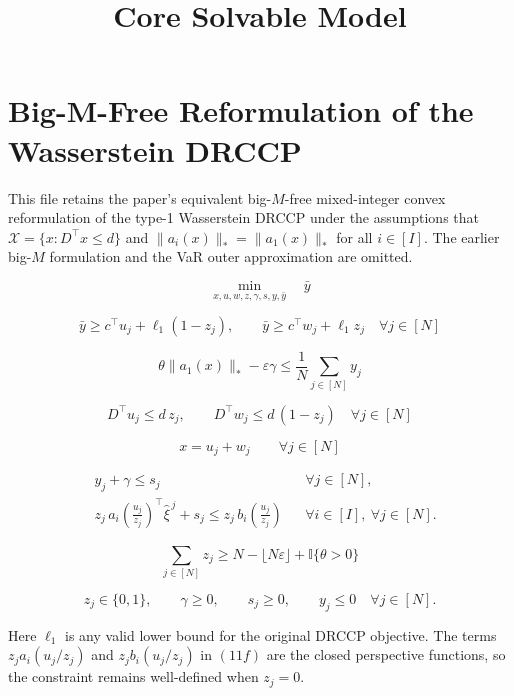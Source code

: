 \documentclass[11pt,a4paper]{article}
\title{Core Solvable Model}
\author{}
\date{}
\begin{document}
\maketitle

\section*{Big-M-Free Reformulation of the Wasserstein DRCCP}
This file retains the paper's equivalent big-\(M\)-free mixed-integer convex reformulation of the type-1 Wasserstein DRCCP under the assumptions that \(\mathcal{X}=\{x: D^\top x \le d\}\) and \(\|a_i(x)\|_* = \|a_1(x)\|_*\) for all \(i\in[I]\). The earlier big-\(M\) formulation and the VaR outer approximation are omitted.

\begin{equation}
\min_{x,u,w,z,\gamma,s,y,\bar y}\quad \bar y
\tag{11a}
\end{equation}

\begin{equation}
\bar y \ge c^\top u_j + \ell_1(1-z_j),
\qquad
\bar y \ge c^\top w_j + \ell_1 z_j
\quad \forall j\in[N]
\tag{11b}
\end{equation}

\begin{equation}
\theta \|a_1(x)\|_* - \varepsilon \gamma
\le
\frac{1}{N}\sum_{j\in[N]} y_j
\tag{11c}
\end{equation}

\begin{equation}
D^\top u_j \le d\,z_j,\qquad
D^\top w_j \le d\,(1-z_j)
\quad \forall j\in[N]
\tag{11d}
\end{equation}

\begin{equation}
x = u_j + w_j
\qquad \forall j\in[N]
\tag{11e}
\end{equation}

\begin{equation}
\begin{aligned}
& y_j + \gamma \le s_j
&& \forall j\in[N], \\
& z_j\, a_i\!\left(\frac{u_j}{z_j}\right)^\top \hat\xi^{\,j} + s_j
\le
z_j\, b_i\!\left(\frac{u_j}{z_j}\right)
&& \forall i\in[I],\ \forall j\in[N].
\end{aligned}
\tag{11f}
\end{equation}

\begin{equation}
\sum_{j\in[N]} z_j \ge N-\lfloor N\varepsilon \rfloor + \mathbb{I}\{\theta>0\}
\tag{11g}
\end{equation}

\begin{equation}
z_j\in\{0,1\},\qquad
\gamma \ge 0,\qquad
s_j \ge 0,\qquad
y_j \le 0
\quad \forall j\in[N].
\tag{11h}
\end{equation}

\noindent
Here \(\ell_1\) is any valid lower bound for the original DRCCP objective. The terms
\(
z_j a_i(u_j/z_j)
\)
and
\(
z_j b_i(u_j/z_j)
\)
in \((11f)\) are the closed perspective functions, so the constraint remains well-defined when \(z_j=0\).
\end{document}
